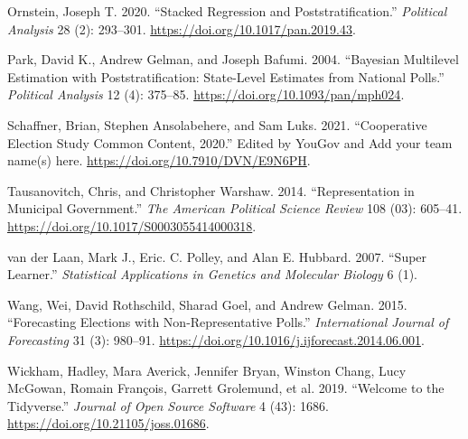 \documentclass[
]{article}
\newlength{\cslhangindent}
\newenvironment{CSLReferences}[2] %
 {%
  \setlength{\parindent}{0pt}
  \ifodd #1 \everypar{\setlength{\hangindent}{\cslhangindent}}\ignorespaces\fi
  \ifnum #2 > 0
  \setlength{\parskip}{#2\baselineskip}
  \fi
 }%
 {}
\begin{document}
\begin{CSLReferences}{1}{0}
\leavevmode{}%
Ornstein, Joseph T. 2020. {``Stacked Regression and
Poststratification.''} \emph{Political Analysis} 28 (2): 293--301.
\url{https://doi.org/10.1017/pan.2019.43}.

\leavevmode{}%
Park, David K., Andrew Gelman, and Joseph Bafumi. 2004. {``Bayesian
Multilevel Estimation with Poststratification: State-Level Estimates
from National Polls.''} \emph{Political Analysis} 12 (4): 375--85.
\url{https://doi.org/10.1093/pan/mph024}.

\leavevmode{}%
Schaffner, Brian, Stephen Ansolabehere, and Sam Luks. 2021.
{``Cooperative Election Study Common Content, 2020.''} Edited by YouGov
and Add your team name(s) here.
\url{https://doi.org/10.7910/DVN/E9N6PH}.

\leavevmode{}%
Tausanovitch, Chris, and Christopher Warshaw. 2014. {``Representation in
Municipal Government.''} \emph{The American Political Science Review}
108 (03): 605--41. \url{https://doi.org/10.1017/S0003055414000318}.

\leavevmode{}%
van der Laan, Mark J., Eric. C. Polley, and Alan E. Hubbard. 2007.
{``Super Learner.''} \emph{Statistical Applications in Genetics and
Molecular Biology} 6 (1).

\leavevmode{}%
Wang, Wei, David Rothschild, Sharad Goel, and Andrew Gelman. 2015.
{``Forecasting Elections with Non-Representative Polls.''}
\emph{International Journal of Forecasting} 31 (3): 980--91.
\url{https://doi.org/10.1016/j.ijforecast.2014.06.001}.

\leavevmode{}%
Wickham, Hadley, Mara Averick, Jennifer Bryan, Winston Chang, Lucy
McGowan, Romain François, Garrett Grolemund, et al. 2019. {``Welcome to
the Tidyverse.''} \emph{Journal of Open Source Software} 4 (43): 1686.
\url{https://doi.org/10.21105/joss.01686}.

\end{CSLReferences}
\end{document}
